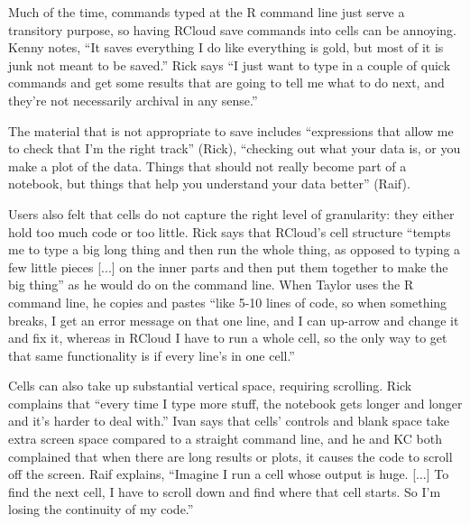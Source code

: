 
Much of the time, commands typed at the R command line just serve a transitory
purpose, so having RCloud save commands into cells can be annoying. Kenny notes, ``It saves everything I do like everything is gold, but most
of it is junk not meant to be saved.'' Rick says ``I just want to type in a
couple of quick commands and get some results that are going to tell
me what to do next, and they're not necessarily archival in any sense.''

The material that is not appropriate to save includes ``expressions that allow
me to check that I'm the right track'' (Rick), ``checking out what your data is,
or you make a plot of the data. Things that should not really become part of a
notebook, but things that help you understand your data better'' (Raif).

Users also felt that cells do not capture the right level of granularity: they
either hold too much code or too little. Rick says that RCloud's cell structure
``tempts me to type a big long thing and then run the whole thing, as opposed to
typing a few little pieces [...] on the inner parts and then put
them together to make the big thing'' as he would do on the command line. When
Taylor uses the R command line, he copies and pastes ``like 5-10 lines of code,
so when something breaks, I get an error message on that one line, and I can
up-arrow and change it and fix it, whereas in RCloud I have to run a whole cell,
so the only way to get that same functionality is if every line's in one
cell.''

Cells can also take up substantial vertical space, requiring scrolling. Rick
complains that ``every time I type more stuff, the notebook gets longer and
longer and it's harder to deal with.'' Ivan says that cells' controls and blank
space take extra screen space compared to a straight command line, and he and
KC both complained that when there are long results or plots, it causes the
code to scroll off the screen. Raif explains, ``Imagine I run a cell whose
output is huge. [...] To find the next cell, I have to scroll down and find
where that cell starts. So I'm losing the continuity of my code.''

